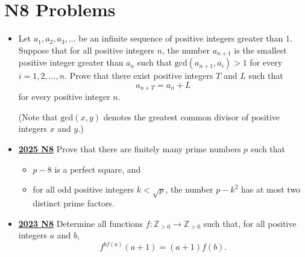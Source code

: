 \documentclass[11pt]{scrartcl}
\begin{document}
\section*{N8 Problems}  \label{N8}
\begin{itemize}[leftmargin=*]


\item {} Let $a_1, a_2, a_3, \ldots$ be an infinite sequence of positive integers greater than $1$. Suppose that for all positive integers $n$, the number $a_{n+1}$ is the smallest positive integer greater than $a_n$ such that $\text{gcd}(a_{n+1}, a_i)>1$ for every $i=1,2,\ldots, n$. Prove that there exist positive integers $T$ and $L$ such that
\[ a_{n+T}=a_n+L\]for every positive integer $n$.

(Note that $\text{gcd}(x,y)$ denotes the greatest common divisor of positive integers $x$ and $y$.)

 \item \href{https://artofproblemsolving.com/community/c6h3866854p38676940}{\textbf{2025 N8}} Prove that there are finitely many prime numbers $p$ such that
\begin{itemize}[leftmargin=*]
    \item[$\bullet$] $p-8$ is a perfect square, and

\item[$\bullet$] for all odd positive integers $k<\sqrt{p}$, the number $p-k^2$ has at most two distinct prime factors.
\end{itemize}


\item \href{https://artofproblemsolving.com/community/c6h3359735p31218397}{\textbf{2023 N8}} Determine all functions $f\colon\mathbb{Z}_{>0}\to\mathbb{Z}_{>0}$ such that, for all positive integers $a$ and $b$,
\[
f^{bf(a)}(a+1)=(a+1)f(b).
\]	


\end{itemize}
\end{document}
